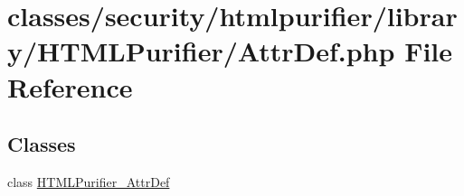 \hypertarget{AttrDef_8php}{\section{classes/security/htmlpurifier/library/\+H\+T\+M\+L\+Purifier/\+Attr\+Def.php File Reference}
\label{AttrDef_8php}
}
\subsection*{Classes}
\begin{DoxyCompactItemize}
\item 
class \hyperlink{classHTMLPurifier__AttrDef}{H\+T\+M\+L\+Purifier\+\_\+\+Attr\+Def}
\end{DoxyCompactItemize}
